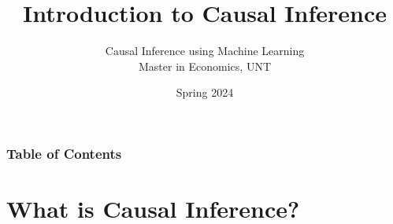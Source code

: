\documentclass[xcolor=svgnames,t]{beamer}
\title[Introduction to Causal Inference]{Introduction to Causal Inference}
\subtitle{}
\author[CIML 2024]{Causal Inference using Machine Learning\\ Master in Economics, UNT}
\institute[]{Andres Mena}
\date{Spring 2024}
\begin{document}
\begin{frame}
\maketitle
\end{frame}


\begin{frame}
    \frametitle{Table of Contents}
    \tableofcontents
\end{frame}

\section{What is Causal Inference?}
\end{document}
